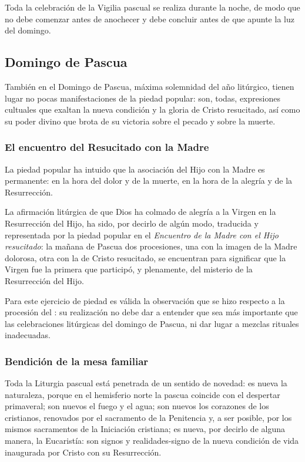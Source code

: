 \begin{introstyle}
Toda la celebración de la Vigilia pascual se realiza durante la noche, de modo que no debe comenzar antes de anochecer y debe concluir antes de que apunte la luz del domingo.

\subsection{Domingo de Pascua}

También en el Domingo de Pascua, máxima solemnidad del año litúrgico, tienen lugar no pocas manifestaciones de la piedad popular: son, todas, expresiones cultuales que exaltan la nueva condición y la gloria de Cristo resucitado, así como su poder divino que brota de su victoria sobre el pecado y sobre la muerte.

\subsubsection{El encuentro del Resucitado con la Madre}

La piedad popular ha intuido que la asociación del Hijo con la Madre es permanente: en la hora del dolor y de la muerte, en la hora de la alegría y de la Resurrección.

La afirmación litúrgica de que Dios ha colmado de alegría a la Virgen en la Resurrección del Hijo, ha sido, por decirlo de algún modo, traducida y representada por la piedad popular en el \textit{Encuentro de la Madre con el Hijo resucitado}: la mañana de Pascua dos procesiones, una con la imagen de la Madre dolorosa, otra con la de Cristo resucitado, se encuentran para significar que la Virgen fue la primera que participó, y plenamente, del misterio de la Resurrección del Hijo.

Para este ejercicio de piedad es válida la observación que se hizo respecto a la procesión del : su realización no debe dar a entender que sea más importante que las celebraciones litúrgicas del domingo de Pascua, ni dar lugar a mezclas rituales inadecuadas.

\subsubsection{Bendición de la mesa familiar}

Toda la Liturgia pascual está penetrada de un sentido de novedad: es nueva la naturaleza, porque en el hemisferio norte la pascua coincide con el despertar primaveral; son nuevos el fuego y el agua; son nuevos los corazones de los cristianos, renovados por el sacramento de la Penitencia y, a ser posible, por los mismos sacramentos de la Iniciación cristiana; es nueva, por decirlo de alguna manera, la Eucaristía: son signos y realidades-signo de la nueva condición de vida inaugurada por Cristo con su Resurrección.


\end{introstyle}
